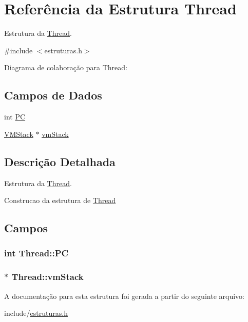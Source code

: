 \hypertarget{struct_thread}{}\section{Referência da Estrutura Thread}
\label{struct_thread}


Estrutura da \hyperlink{struct_thread}{Thread}.  




{\ttfamily \#include $<$estruturas.\+h$>$}



Diagrama de colaboração para Thread\+:
\subsection*{Campos de Dados}
\begin{DoxyCompactItemize}
\item 
int \hyperlink{struct_thread_acbbbde7dd2d37d9536513e2cdbae37f6}{PC}
\item 
\hyperlink{struct_v_m_stack}{V\+M\+Stack} $\ast$ \hyperlink{struct_thread_a14942cb194dc5185288e629c6da5ac3a}{vm\+Stack}
\end{DoxyCompactItemize}


\subsection{Descrição Detalhada}
Estrutura da \hyperlink{struct_thread}{Thread}. 

Construcao da estrutura de \hyperlink{struct_thread}{Thread} 

\subsection{Campos}
\subsubsection[{\texorpdfstring{PC}{PC}}]{\setlength{\rightskip}{0pt plus 5cm}int Thread\+::\+PC}\hypertarget{struct_thread_acbbbde7dd2d37d9536513e2cdbae37f6}{}\label{struct_thread_acbbbde7dd2d37d9536513e2cdbae37f6}
\subsubsection[{\texorpdfstring{vm\+Stack}{vmStack}}]{$\ast$ Thread\+::vm\+Stack}\hypertarget{struct_thread_a14942cb194dc5185288e629c6da5ac3a}{}\label{struct_thread_a14942cb194dc5185288e629c6da5ac3a}


A documentação para esta estrutura foi gerada a partir do seguinte arquivo\+:\begin{DoxyCompactItemize}
\item 
include/\hyperlink{estruturas_8h}{estruturas.\+h}\end{DoxyCompactItemize}
